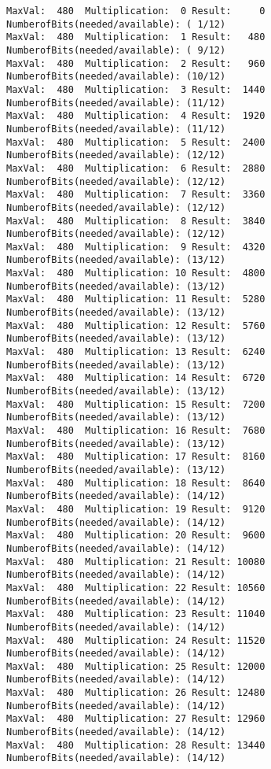 \documentclass{article}
\begin{document}
    \begin{Verbatim}[commandchars=\\\{\}]
MaxVal:  480  Multiplication:  0 Result:     0 NumberofBits(needed/available): ( 1/12)
MaxVal:  480  Multiplication:  1 Result:   480 NumberofBits(needed/available): ( 9/12)
MaxVal:  480  Multiplication:  2 Result:   960 NumberofBits(needed/available): (10/12)
MaxVal:  480  Multiplication:  3 Result:  1440 NumberofBits(needed/available): (11/12)
MaxVal:  480  Multiplication:  4 Result:  1920 NumberofBits(needed/available): (11/12)
MaxVal:  480  Multiplication:  5 Result:  2400 NumberofBits(needed/available): (12/12)
MaxVal:  480  Multiplication:  6 Result:  2880 NumberofBits(needed/available): (12/12)
MaxVal:  480  Multiplication:  7 Result:  3360 NumberofBits(needed/available): (12/12)
MaxVal:  480  Multiplication:  8 Result:  3840 NumberofBits(needed/available): (12/12)
MaxVal:  480  Multiplication:  9 Result:  4320 NumberofBits(needed/available): (13/12)
MaxVal:  480  Multiplication: 10 Result:  4800 NumberofBits(needed/available): (13/12)
MaxVal:  480  Multiplication: 11 Result:  5280 NumberofBits(needed/available): (13/12)
MaxVal:  480  Multiplication: 12 Result:  5760 NumberofBits(needed/available): (13/12)
MaxVal:  480  Multiplication: 13 Result:  6240 NumberofBits(needed/available): (13/12)
MaxVal:  480  Multiplication: 14 Result:  6720 NumberofBits(needed/available): (13/12)
MaxVal:  480  Multiplication: 15 Result:  7200 NumberofBits(needed/available): (13/12)
MaxVal:  480  Multiplication: 16 Result:  7680 NumberofBits(needed/available): (13/12)
MaxVal:  480  Multiplication: 17 Result:  8160 NumberofBits(needed/available): (13/12)
MaxVal:  480  Multiplication: 18 Result:  8640 NumberofBits(needed/available): (14/12)
MaxVal:  480  Multiplication: 19 Result:  9120 NumberofBits(needed/available): (14/12)
MaxVal:  480  Multiplication: 20 Result:  9600 NumberofBits(needed/available): (14/12)
MaxVal:  480  Multiplication: 21 Result: 10080 NumberofBits(needed/available): (14/12)
MaxVal:  480  Multiplication: 22 Result: 10560 NumberofBits(needed/available): (14/12)
MaxVal:  480  Multiplication: 23 Result: 11040 NumberofBits(needed/available): (14/12)
MaxVal:  480  Multiplication: 24 Result: 11520 NumberofBits(needed/available): (14/12)
MaxVal:  480  Multiplication: 25 Result: 12000 NumberofBits(needed/available): (14/12)
MaxVal:  480  Multiplication: 26 Result: 12480 NumberofBits(needed/available): (14/12)
MaxVal:  480  Multiplication: 27 Result: 12960 NumberofBits(needed/available): (14/12)
MaxVal:  480  Multiplication: 28 Result: 13440 NumberofBits(needed/available): (14/12)

\end{Verbatim}
\end{document}
